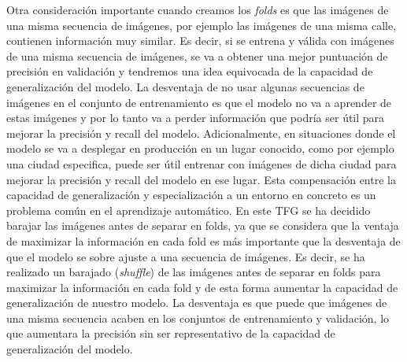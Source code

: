 Otra consideración importante cuando creamos los \textit{folds} es que las imágenes de una misma secuencia de imágenes, por ejemplo las imágenes de una misma calle, contienen información muy similar. Es decir, si se entrena y válida con imágenes de una misma secuencia de imágenes, se va a obtener una mejor puntuación de precisión en validación y tendremos una idea equivocada de la capacidad de generalización del modelo. La desventaja de no usar algunas secuencias de imágenes en el conjunto de entrenamiento es que el modelo no va a aprender de estas imágenes y por lo tanto va a perder información que podría ser útil para mejorar la precisión y recall del modelo. Adicionalmente, en situaciones donde el modelo se va a desplegar en producción en un lugar conocido, como por ejemplo una ciudad especifica, puede ser útil entrenar con imágenes de dicha ciudad para mejorar la precisión y recall del modelo en ese lugar. Esta compensación entre la capacidad de generalización y especialización a un entorno en concreto es un problema común en el aprendizaje automático. En este TFG se ha decidido barajar las imágenes antes de separar en folds, ya que se considera que la ventaja de maximizar la información en cada fold es más importante que la desventaja de que el modelo se sobre ajuste a una secuencia de imágenes. Es decir, se ha realizado un barajado (\textit{shuffle}) de las imágenes antes de separar en folds para maximizar la información en cada fold y de esta forma aumentar la capacidad de generalización de nuestro modelo. La desventaja es que puede que imágenes de una misma secuencia acaben en los conjuntos de entrenamiento y validación, lo que aumentara la precisión sin ser representativo de la capacidad de generalización del modelo.